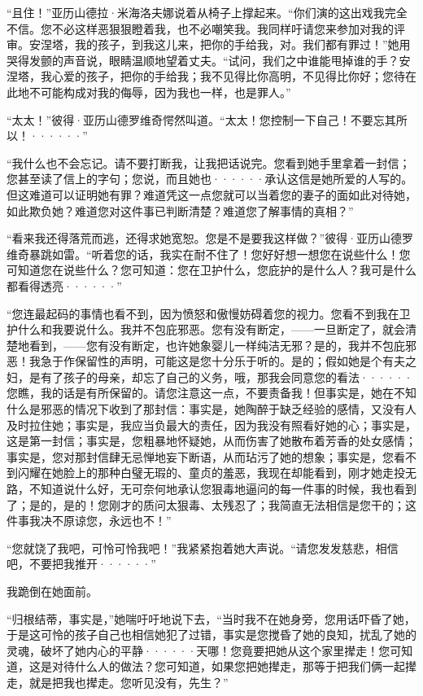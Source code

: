\documentclass[12pt, UTF8]{ctexbook}
\begin{document}
\par “且住！”亚历山德拉·米海洛夫娜说着从椅子上撑起来。“你们演的这出戏我完全不信。您不必这样恶狠狠瞪着我，也不必嘲笑我。我同样吁请您来参加对我的评审。安涅塔，我的孩子，到我这儿来，把你的手给我，对。我们都有罪过！”她用哭得发颤的声音说，眼睛温顺地望着丈夫。“试问，我们之中谁能甩掉谁的手？安涅塔，我心爱的孩子，把你的手给我；我不见得比你高明，不见得比你好；您待在此地不可能构成对我的侮辱，因为我也一样，也是罪人。”
\par “太太！”彼得·亚历山德罗维奇愕然叫道。“太太！您控制一下自己！不要忘其所以！······”
\par “我什么也不会忘记。请不要打断我，让我把话说完。您看到她手里拿着一封信；您甚至读了信上的字句；您说，而且她也······承认这信是她所爱的人写的。但这难道可以证明她有罪？难道凭这一点您就可以当着您的妻子的面如此对待她，如此欺负她？难道您对这件事已判断清楚？难道您了解事情的真相？”
\par “看来我还得落荒而逃，还得求她宽恕。您是不是要我这样做？”彼得·亚历山德罗维奇暴跳如雷。“听着您的话，我实在耐不住了！您好好想一想您在说些什么！您可知道您在说些什么？您可知道：您在卫护什么，您庇护的是什么人？我可是什么都看得透亮······”
\par “您连最起码的事情也看不到，因为愤怒和傲慢妨碍着您的视力。您看不到我在卫护什么和我要说什么。我并不包庇邪恶。您有没有断定，——一旦断定了，就会清楚地看到，——您有没有断定，也许她象婴儿一样纯洁无邪？是的，我并不包庇邪恶！我急于作保留性的声明，可能这是您十分乐于听的。是的；假如她是个有夫之妇，是有了孩子的母亲，却忘了自己的义务，哦，那我会同意您的看法······您瞧，我的话是有所保留的。请您注意这一点，不要责备我！但事实是，她在不知什么是邪恶的情况下收到了那封信：事实是，她陶醉于缺乏经验的感情，又没有人及时拉住她；事实是，我应当负最大的责任，因为我没有照看好她的心；事实是，这是第一封信；事实是，您粗暴地怀疑她，从而伤害了她散布着芳香的处女感情；事实是，您对那封信肆无忌惮地妄下断语，从而玷污了她的想象；事实是，您看不到闪耀在她脸上的那种白璧无瑕的、童贞的羞恶，我现在却能看到，刚才她走投无路，不知道说什么好，无可奈何地承认您狠毒地逼问的每一件事的时候，我也看到了；是的，是的！您刚才的质问太狠毒、太残忍了；我简直无法相信是您干的；这件事我决不原谅您，永远也不！”
\par “您就饶了我吧，可怜可怜我吧！”我紧紧抱着她大声说。“请您发发慈悲，相信吧，不要把我推开······”
\par 我跪倒在她面前。
\par “归根结蒂，事实是，”她喘吁吁地说下去，“当时我不在她身旁，您用话吓昏了她，于是这可怜的孩子自己也相信她犯了过错，事实是您搅昏了她的良知，扰乱了她的灵魂，破坏了她内心的平静······天哪！您竟要把她从这个家里撵走！您可知道，这是对待什么人的做法？您可知道，如果您把她撵走，那等于把我们俩一起撵走，就是把我也撵走。您听见没有，先生？”
\end{document}
